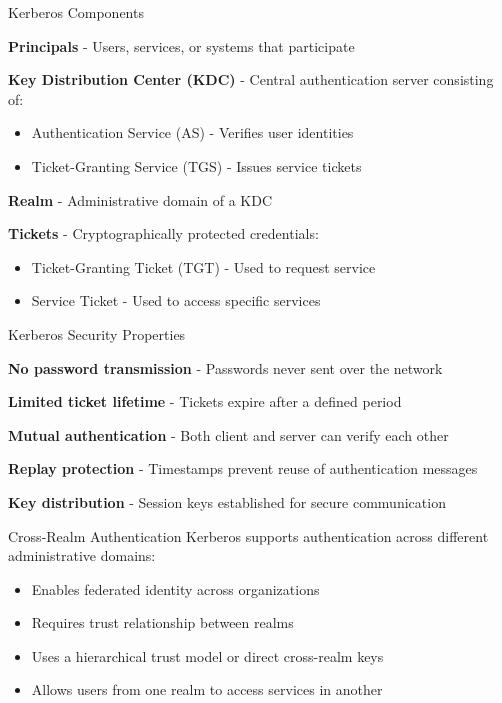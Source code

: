 \begin{concept}{Kerberos Components}

    \textbf{Principals} - Users, services, or systems that participate 

    \textbf{Key Distribution Center (KDC)} - Central authentication server consisting of:
    \begin{itemize}
        \item Authentication Service (AS) - Verifies user identities
        \item Ticket-Granting Service (TGS) - Issues service tickets
    \end{itemize}

    \textbf{Realm} - Administrative domain of a KDC

    \textbf{Tickets} - Cryptographically protected credentials:
    \begin{itemize}
        \item Ticket-Granting Ticket (TGT) - Used to request service 
        \item Service Ticket - Used to access specific services
    \end{itemize}

\end{concept}





\begin{theorem}{Kerberos Security Properties}

    \textbf{No password transmission} - Passwords never sent over the network

    \textbf{Limited ticket lifetime} - Tickets expire after a defined period

    \textbf{Mutual authentication} - Both client and server can verify each other

    \textbf{Replay protection} - Timestamps prevent reuse of authentication messages

    \textbf{Key distribution} - Session keys established for secure communication

\end{theorem}

\begin{concept}{Cross-Realm Authentication}
Kerberos supports authentication across different administrative domains:
\begin{itemize}
    \item Enables federated identity across organizations
    \item Requires trust relationship between realms
    \item Uses a hierarchical trust model or direct cross-realm keys
    \item Allows users from one realm to access services in another
\end{itemize}
\end{concept}



